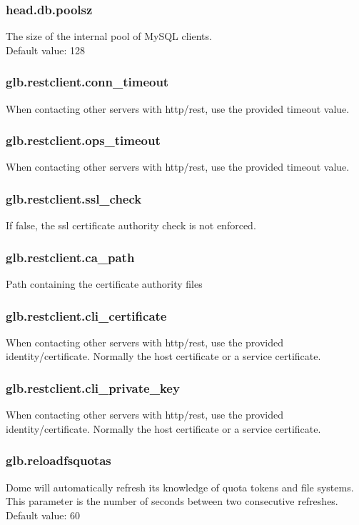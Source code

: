 \documentclass[a4paper,10pt]{scrreprt}
\begin{document}
\subsubsection{head.db.poolsz}
The size of the internal pool of MySQL clients.\\
Default value: 128\\

\subsubsection{glb.restclient.conn\_timeout}
When contacting other servers with http/rest, use the provided timeout value.
\subsubsection{glb.restclient.ops\_timeout}
When contacting other servers with http/rest, use the provided timeout value.
\subsubsection{glb.restclient.ssl\_check}
If false, the ssl certificate authority check is not enforced.
\subsubsection{glb.restclient.ca\_path}
Path containing the certificate authority files
\subsubsection{glb.restclient.cli\_certificate}
When contacting other servers with http/rest, use the provided identity/certificate. Normally the host certificate or a service certificate.
\subsubsection{glb.restclient.cli\_private\_key}
When contacting other servers with http/rest, use the provided identity/certificate. Normally the host certificate or a service certificate.


\subsubsection{glb.reloadfsquotas}
Dome will automatically refresh its knowledge of quota tokens and file systems. This parameter is the number of seconds between two consecutive refreshes.\\
Default value: 60\\
\end{document}
